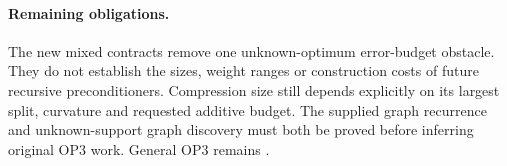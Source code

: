 \paragraph{Remaining obligations.}
The new mixed contracts remove one unknown-optimum error-budget obstacle.
They do not establish the sizes, weight ranges or construction costs of
future recursive preconditioners. Compression size still depends explicitly
on its largest split, curvature and requested additive budget. The supplied
graph recurrence and unknown-support graph discovery must both be proved
before inferring original OP3 work. General OP3 remains \statusopen{}.
